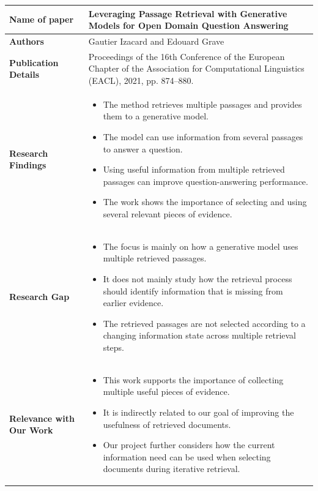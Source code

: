 \documentclass[12pt,a4paper]{report}
\begin{document}
\begin{longtable}{|p{1.25in}|p{5.15in}|}
\hline

\textbf{Name of paper} & Leveraging Passage Retrieval with Generative Models for Open Domain Question Answering \cite{izacard2021fid} \\ \hline

\textbf{Authors} & Gautier Izacard and Edouard Grave \\ \hline

\textbf{Publication Details} & Proceedings of the 16th Conference of the European Chapter of the Association for Computational Linguistics (EACL), 2021, pp. 874--880. \\ \hline

\textbf{Research Findings} &
\begin{itemize}[leftmargin=0.18in,itemsep=0.05in,topsep=0pt,parsep=0pt]
\item The method retrieves multiple passages and provides them to a generative model.
\item The model can use information from several passages to answer a question.
\item Using useful information from multiple retrieved passages can improve question-answering performance.
\item The work shows the importance of selecting and using several relevant pieces of evidence.
\end{itemize} \\ \hline

\textbf{Research Gap} &
\begin{itemize}[leftmargin=0.18in,itemsep=0.05in,topsep=0pt,parsep=0pt]
\item The focus is mainly on how a generative model uses multiple retrieved passages.
\item It does not mainly study how the retrieval process should identify information that is missing from earlier evidence.
\item The retrieved passages are not selected according to a changing information state across multiple retrieval steps.
\end{itemize} \\ \hline

\textbf{Relevance with Our Work} &
\begin{itemize}[leftmargin=0.18in,itemsep=0.05in,topsep=0pt,parsep=0pt]
\item This work supports the importance of collecting multiple useful pieces of evidence.
\item It is indirectly related to our goal of improving the usefulness of retrieved documents.
\item Our project further considers how the current information need can be used when selecting documents during iterative retrieval.
\end{itemize} \\ \hline
\end{longtable}
\clearpage
\end{document}
